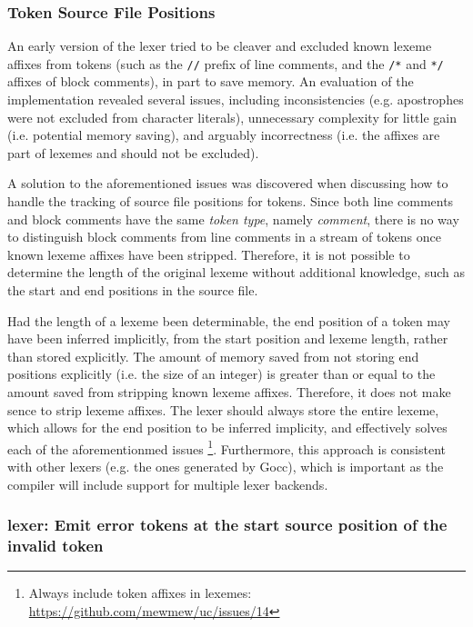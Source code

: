 \subsubsection{Token Source File Positions}

An early version of the lexer tried to be cleaver and excluded known lexeme affixes from tokens (such as the \texttt{//} prefix of line comments, and the \texttt{/*} and \texttt{*/} affixes of block comments), in part to save memory. An evaluation of the implementation revealed several issues, including inconsistencies (e.g. apostrophes were not excluded from character literals), unnecessary complexity for little gain (i.e. potential memory saving), and arguably incorrectness (i.e. the affixes are part of lexemes and should not be excluded).

A solution to the aforementioned issues was discovered when discussing how to handle the tracking of source file positions for tokens. Since both line comments and block comments have the same \textit{token type}, namely \textit{comment}, there is no way to distinguish block comments from line comments in a stream of tokens once known lexeme affixes have been stripped. Therefore, it is not possible to determine the length of the original lexeme without additional knowledge, such as the start and end positions in the source file.

Had the length of a lexeme been determinable, the end position of a token may have been inferred implicitly, from the start position and lexeme length, rather than stored explicitly. The amount of memory saved from not storing end positions explicitly (i.e. the size of an integer) is greater than or equal to the amount saved from stripping known lexeme affixes. Therefore, it does not make sence to strip lexeme affixes. The lexer should always store the entire lexeme, which allows for the end position to be inferred implicity, and effectively solves each of the aforementionmed issues \footnote{Always include token affixes in lexemes: \url{https://github.com/mewmew/uc/issues/14}}. Furthermore, this approach is consistent with other lexers (e.g. the ones generated by Gocc), which is important as the compiler will include support for multiple lexer backends.

\subsubsection{lexer: Emit error tokens at the start source position of the invalid token}

